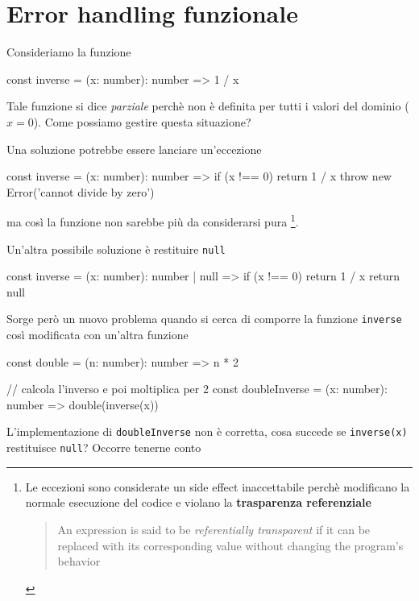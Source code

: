 \documentclass[12pt]{article}
\theoremstyle{definition}
\newenvironment{code}
  {\vspace{0.5cm} \VerbatimEnvironment\begin{typescriptcode}}
  {\end{typescriptcode} \vspace{0.2cm}}
\begin{document}
\newpage
\section{Error handling funzionale}

Consideriamo la funzione

\begin{code}
const inverse = (x: number): number => 1 / x
\end{code}

Tale funzione si dice \emph{parziale} perchè non è definita per tutti i valori del dominio ($x = 0$).
Come possiamo gestire questa situazione?

Una soluzione potrebbe essere lanciare un'eccezione

\begin{code}
const inverse = (x: number): number => {
  if (x !== 0) return 1 / x
  throw new Error('cannot divide by zero')
}
\end{code}

ma così la funzione non sarebbe più da considerarsi pura
\footnote{Le eccezioni sono considerate un side effect inaccettabile perchè modificano la normale esecuzione del codice
e violano la \textbf{trasparenza referenziale}

\begin{quote}
An expression is said to be \emph{referentially transparent} if it can be replaced with its corresponding value without changing the program's behavior
\end{quote}
}.

Un'altra possibile soluzione è restituire \texttt{null}

\begin{code}
const inverse = (x: number): number | null => {
  if (x !== 0) return 1 / x
  return null
}
\end{code}

Sorge però un nuovo problema quando si cerca di comporre la funzione \texttt{inverse} così modificata con un'altra funzione

\begin{code}
const double = (n: number): number => n * 2

// calcola l'inverso e poi moltiplica per 2
const doubleInverse = (x: number): number => double(inverse(x))
\end{code}

L'implementazione di \texttt{doubleInverse} non è corretta, cosa succede se \texttt{inverse(x)} restituisce \texttt{null}?
Occorre tenerne conto
\end{document}
